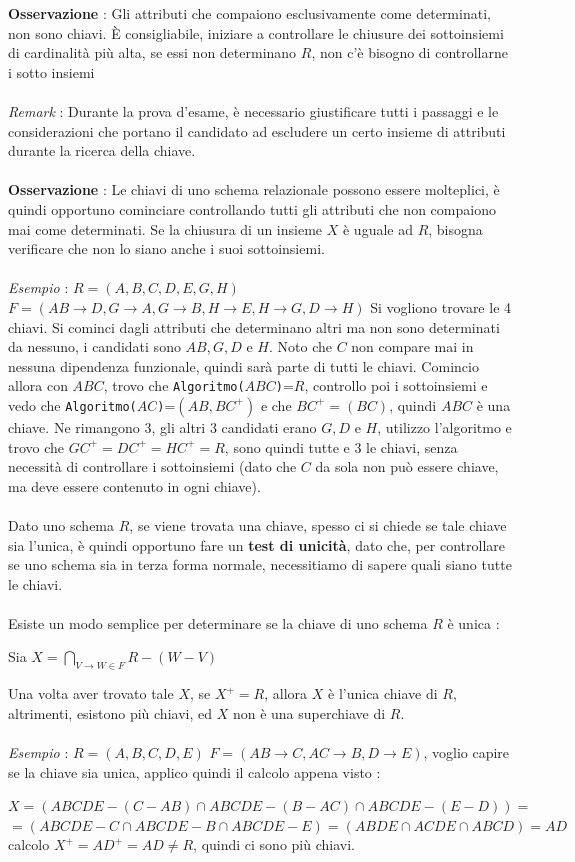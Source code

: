 \documentclass[12pt, letterpaper]{article}
\newcommand{\codee}[1]{\colorbox{white}{\texttt{#1}}}
\newcommand{\acc}{\\\hphantom{}\\}
\newcommand{\dete}{{\rightarrow}}
\begin{document}
\textbf{Osservazione} : Gli attributi che compaiono esclusivamente come determinati, non sono chiavi. È consigliabile, iniziare a controllare 
le chiusure dei sottoinsiemi di cardinalità più alta, se essi non determinano \(R\), non c'è bisogno di controllarne i 
sotto insiemi
\acc\textit{Remark }: Durante la prova d'esame, è necessario giustificare tutti i passaggi e le considerazioni che portano il candidato 
ad escludere un certo insieme di attributi durante la ricerca della chiave.\acc 
\textbf{Osservazione} : Le chiavi di uno schema relazionale possono essere molteplici, è quindi opportuno cominciare 
controllando tutti gli attributi che non compaiono mai come determinati. Se la chiusura di un insieme \(X\) è uguale ad 
\(R\), bisogna verificare che non lo siano anche i suoi sottoinsiemi.\acc
\textit{Esempio} : \(R=(A,B,C,D,E,G,H)\)\hphantom{  } \(F=(AB\dete D,G\dete A,G\dete B,H\dete E,H\dete G,D\dete H)\) 
Si vogliono trovare le 4 chiavi. Si cominci dagli attributi che determinano altri ma non sono determinati da nessuno, i 
candidati sono \(AB,G,D\) e \(H\). Noto che \(C\) non compare mai in nessuna dipendenza funzionale, quindi sarà 
parte di tutti le chiavi. Comincio allora con \(ABC\), trovo che \codee{Algoritmo(}\(ABC\)\codee{)}=\(R\), controllo poi 
i sottoinsiemi e vedo che \codee{Algoritmo(}\(AC\)\codee{)}=\((AB, BC^+)\) e che \(BC^+=(BC)\), quindi \(ABC\) è una chiave. 
Ne rimangono 3, gli altri 3 candidati erano \(G,D\) e \(H\), utilizzo l'algoritmo e trovo che \(GC^+=DC^+=HC^+=R\), sono quindi 
tutte e 3 le chiavi, senza necessità di controllare i sottoinsiemi (dato che \(C\) da sola non può essere chiave, ma deve 
essere contenuto in ogni chiave).\acc 
Dato uno schema \(R\), se viene trovata una chiave, spesso ci si chiede se tale chiave sia l'unica, è quindi opportuno 
fare un \textbf{test di unicità}, dato che, per controllare se uno schema sia in terza forma normale, necessitiamo di sapere quali 
siano tutte le chiavi. \acc 
Esiste un modo semplice per determinare se la chiave di uno schema \(R\) è unica :\begin{center}
    Sia \(X=\displaystyle\bigcap_{V\rightarrow W\in F}R-(W-V)\)
\end{center}
Una volta aver trovato tale \(X\), se \(X^+=R\), allora \(X\) è l'unica chiave di \(R\), altrimenti, esistono più chiavi, 
ed \(X\) non è una superchiave di \(R\).\acc 
\textit{Esempio} : \(R=(A,B,C,D,E)\)\hphantom{  } \(F=(AB\dete C,AC\dete B,D\dete E)\), voglio capire se la chiave sia unica, 
applico quindi il calcolo appena visto :\begin{center}
    
    \(X=(ABCDE-(C-AB)\cap ABCDE-(B-AC)\cap ABCDE-(E-D))=\)\\
    \(=(ABCDE-C\cap ABCDE-B\cap ABCDE-E)=(ABDE\cap ACDE\cap ABCD)=AD\)\\
    calcolo \(X^+=AD^+=AD\ne R\), quindi ci sono più chiavi.
\end{center}
\end{document}

